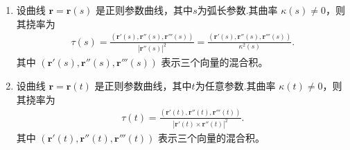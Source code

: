 \documentclass[../../main.tex]{subfiles}%
\begin{document}
\begin{theorem}[曲线挠率的计算公式]\label{theorem:微分几何-曲线挠率的计算公式}
\begin{enumerate}
\item 设曲线 $\bm{r}=\bm{r}(s)$ 是正则参数曲线，其中$s$为弧长参数.其曲率 $\kappa(s)\neq 0$，则其挠率为
\begin{align}
\tau (s)=\frac{(\boldsymbol{r}\prime (s),\boldsymbol{r}'' (s),\boldsymbol{r}''' (s))}{|\boldsymbol{r}'' (s)|^2}=\frac{(\boldsymbol{r}\prime (s),\boldsymbol{r}'' (s),\boldsymbol{r}''' (s))}{\kappa ^2\left( s \right)}. \label{eq:tor_arc}
\end{align}
其中 $(\bm{r}'(s), \bm{r}''(s), \bm{r}'''(s))$ 表示三个向量的混合积。

\item 设曲线 $\bm{r}=\bm{r}(t)$ 是正则参数曲线，其中$t$为任意参数.其曲率 $\kappa(t)\neq 0$，则其挠率为
\begin{align}
\tau(t) = \frac{(\bm{r}'(t), \bm{r}''(t), \bm{r}'''(t))}{|\bm{r}'(t) \times \bm{r}''(t)|^2}. \label{eq:tor_gen}
\end{align}
其中 $(\bm{r}'(t), \bm{r}''(t), \bm{r}'''(t))$ 表示三个向量的混合积。
\end{enumerate}
\end{theorem}
\end{document}
